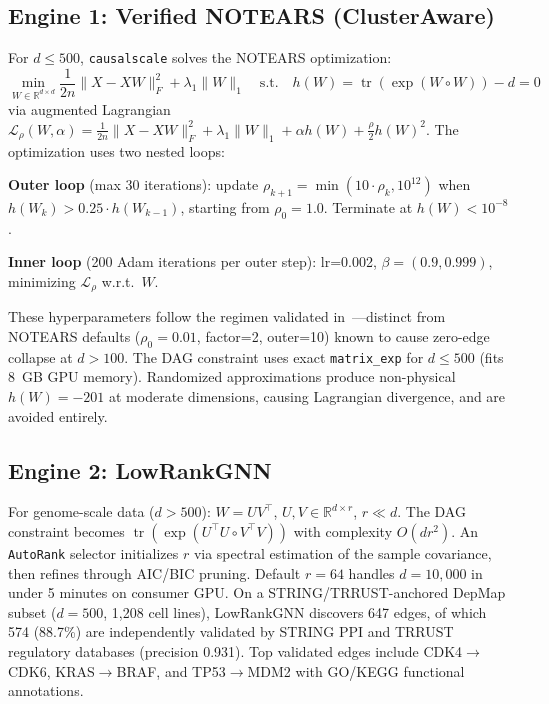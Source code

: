 \documentclass[sigconf,review]{acmart}
\begin{document}
\subsection{Engine 1: Verified NOTEARS (ClusterAware)}

For $d\le500$, \texttt{causalscale} solves the NOTEARS optimization:
\begin{equation}
\min_{W\in\mathbb{R}^{d\times d}} \frac{1}{2n}\|X-XW\|_F^2 + \lambda_1\|W\|_1 \quad\text{s.t.}\quad h(W)=\operatorname{tr}(\exp(W\circ W))-d=0 \label{eq:notears}
\end{equation}
via augmented Lagrangian $\mathcal{L}_\rho(W,\alpha)=\frac{1}{2n}\|X-XW\|_F^2+\lambda_1\|W\|_1+\alpha h(W)+\frac{\rho}{2}h(W)^2$. The optimization uses two nested loops:

\textbf{Outer loop} (max 30 iterations): update $\rho_{k+1}=\min(10\cdot\rho_k,10^{12})$ when $h(W_k)>0.25\cdot h(W_{k-1})$, starting from $\rho_0=1.0$. Terminate at $h(W)<10^{-8}$.

\textbf{Inner loop} (200 Adam iterations per outer step): lr=0.002, $\beta=(0.9,0.999)$, minimizing $\mathcal{L}_\rho$ w.r.t.~$W$.

These hyperparameters follow the regimen validated in~\cite{gao2025diagnostic}---distinct from NOTEARS defaults ($\rho_0=0.01$, factor=2, outer=10) known to cause zero-edge collapse at $d>100$. The DAG constraint uses exact \texttt{matrix\_exp} for $d\le500$ (fits 8~GB GPU memory). Randomized approximations produce non-physical $h(W)=-201$ at moderate dimensions, causing Lagrangian divergence, and are avoided entirely.

\subsection{Engine 2: LowRankGNN}

For genome-scale data ($d>500$): $W=UV^\top$, $U,V\in\mathbb{R}^{d\times r}$, $r\ll d$. The DAG constraint becomes $\operatorname{tr}(\exp(U^\top U\circ V^\top V))$ with complexity $O(dr^2)$. An \texttt{AutoRank} selector initializes $r$ via spectral estimation of the sample covariance, then refines through AIC/BIC pruning. Default $r=64$ handles $d=10{,}000$ in under 5 minutes on consumer GPU. On a STRING/TRRUST-anchored DepMap subset ($d=500$, 1,208 cell lines), LowRankGNN discovers 647 edges, of which 574 (88.7\%) are independently validated by STRING PPI and TRRUST regulatory databases (precision 0.931). Top validated edges include CDK4$\rightarrow$CDK6, KRAS$\rightarrow$BRAF, and TP53$\rightarrow$MDM2 with GO/KEGG functional annotations.
\end{document}
